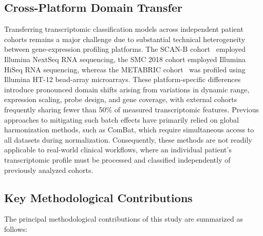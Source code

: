 \documentclass[10pt,a4paper,twocolumn]{article}
\begin{document}
\subsection{Cross-Platform Domain Transfer}
Transferring transcriptomic classification models across independent patient cohorts remains a major challenge due to substantial technical heterogeneity between gene-expression profiling platforms. The SCAN-B cohort~\cite{sjostrom2022} employed Illumina NextSeq RNA sequencing, the SMC 2018 cohort employed Illumina HiSeq RNA sequencing, whereas the METABRIC cohort~\cite{curtis2012} was profiled using Illumina HT-12 bead-array microarrays. These platform-specific differences introduce pronounced domain shifts arising from variations in dynamic range, expression scaling, probe design, and gene coverage, with external cohorts frequently sharing fewer than 50\% of measured transcriptomic features. Previous approaches to mitigating such batch effects have primarily relied on global harmonization methods, such as ComBat, which require simultaneous access to all datasets during normalization. Consequently, these methods are not readily applicable to real-world clinical workflows, where an individual patient's transcriptomic profile must be processed and classified independently of previously analyzed cohorts.

\subsection{Key Methodological Contributions}

The principal methodological contributions of this study are summarized as follows:
\end{document}
